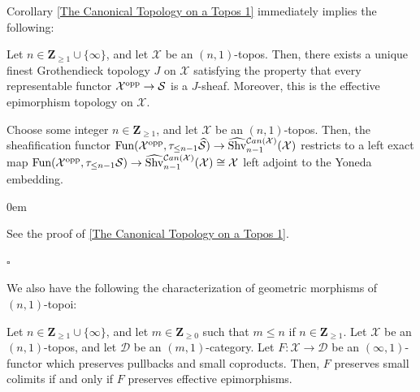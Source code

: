 \documentclass[10pt]{article}
\newcommand{\mS}{\mathcal S}
\newcommand{\C}{\mathcal C}
\newcommand{\cD}{\mathcal{D}}
\newcommand{\cX}{\mathcal{X}}
\newcommand{\ZZ}{\mathbb{Z}}
\def\ZZ{{\mathbf Z}}
\renewcommand{\qed}{\hfill$\square$}
\renewenvironment{proof}{\begin{addmargin}[1em]{0em}\begin{newproof}}{\end{newproof}\end{addmargin}\qed}
\theoremstyle{witharg}
\theoremstyle{witharg}
\theoremstyle{witharg2}
\begin{document}
\noindent Corollary \ref{The Canonical Topology on a Topos 1} immediately implies the following:


\begin{corollary}{}\label{The Canonical Topology on a Topos}
    Let $n\in \ZZ_{\geq 1}\cup \{\infty\}$, and let $\cX$ be an $(n,1)$-topos. Then, there exists a unique finest Grothendieck topology $J$ on $\cX$ satisfying the property that every representable functor $\cX^{\textnormal{opp}}\rightarrow \mS$ is a $J$-sheaf. Moreover, this is the effective epimorphism topology on $\cX$. 
\end{corollary}

\begin{corollary}{}\label{Sheafification For n Topoi}

Choose some integer $n\in \ZZ_{\geq 1}$, and let $\cX$ be an $(n,1)$-topos. Then, the sheafification functor $\textnormal{Fun}(\cX^{\textnormal{opp}},\tau_{\leq n-1}\widehat{\mS})\rightarrow \widehat{\textnormal{Shv}}\vphantom{}^{\C an(\cX)}_{n-1}(\cX)$ restricts to a left exact map $\textnormal{Fun}(\cX^{\textnormal{opp}},\tau_{\leq n-1}\mS)\rightarrow \widehat{\textnormal{Shv}}\vphantom{}_{n-1}^{\C an(\cX)}(\cX)\cong \cX$ left adjoint to the Yoneda embedding. 
  
\end{corollary}

\begin{proof}

    See the proof of \ref{The Canonical Topology on a Topos 1}.
    
\end{proof}



\noindent We also have the following the characterization of geometric morphisms of $(n,1)$-topoi:

\begin{corollary}{}

    Let $n\in \ZZ_{\geq 1}\cup \{\infty\}$, and let $m\in \ZZ_{\geq 0}$ such that $m\leq n$ if $n\in \ZZ_{\geq 1}$. Let $\cX$ be an $(n,1)$-topos, and let $\cD$ be an $(m,1)$-category. Let $F:\cX\rightarrow \cD$ be an $(\infty,1)$-functor which preserves pullbacks and small coproducts. Then, $F$ preserves small colimits if and only if $F$ preserves effective epimorphisms.

\end{corollary}
\end{document}
